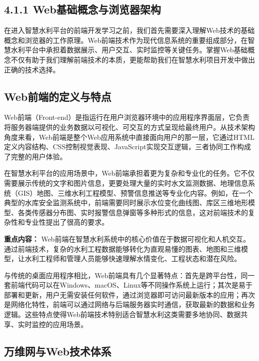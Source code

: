 \subsection{4.1.1 Web基础概念与浏览器架构}\label{webux57faux7840ux6982ux5ff5ux4e0eux6d4fux89c8ux5668ux67b6ux6784}

在进入智慧水利平台的前端开发学习之前，我们首先需要深入理解Web技术的基础概念和浏览器的工作原理。Web前端技术作为现代信息系统的重要组成部分，在智慧水利平台中承担着数据展示、用户交互、实时监控等关键任务。掌握Web基础概念不仅有助于我们理解前端技术的本质，更能帮助我们在智慧水利项目开发中做出正确的技术选择。

\subsection{Web前端的定义与特点}\label{webux524dux7aefux7684ux5b9aux4e49ux4e0eux7279ux70b9}

Web前端（Front-end）是指运行在用户浏览器环境中的应用程序界面层，它负责将服务器端提供的业务数据以可视化、可交互的方式呈现给最终用户。从技术架构角度来看，Web前端是整个Web应用系统中直接面向用户的那一层，它通过HTML定义内容结构、CSS控制视觉表现、JavaScript实现交互逻辑，三者协同工作构成了完整的用户体验。

在智慧水利平台的应用场景中，Web前端承担着更为复杂和专业化的任务。它不仅需要展示传统的文字和图片信息，更要处理大量的实时水文监测数据、地理信息系统（GIS）地图、三维水利工程模型、预警信息推送等专业化内容。例如，在一个典型的水库安全监测系统中，前端需要同时展示水位变化曲线图、库区三维地形模型、各类传感器分布图、实时报警信息弹窗等多种形式的信息，这对前端技术的复杂性和专业性提出了很高的要求。

\textbf{重点内容：} Web前端在智慧水利系统中的核心价值在于数据可视化和人机交互。通过前端技术，复杂的水利工程数据能够转化为直观易懂的图表、地图和三维模型，让水利工程师和管理人员能够快速理解水情变化、工程状态和潜在风险。

与传统的桌面应用程序相比，Web前端具有几个显著特点：首先是跨平台性，同一套前端代码可以在Windows、macOS、Linux等不同操作系统上运行；其次是易于部署和更新，用户无需安装任何软件，通过浏览器即可访问最新版本的应用；再次是网络化特性，前端可以通过网络与后端服务器实时通信，获取最新的数据和业务逻辑。这些特点使得Web前端技术特别适合智慧水利这类需要多地协同、数据共享、实时监控的应用场景。

\subsection{万维网与Web技术体系}\label{ux4e07ux7ef4ux7f51ux4e0ewebux6280ux672fux4f53ux7cfb}

